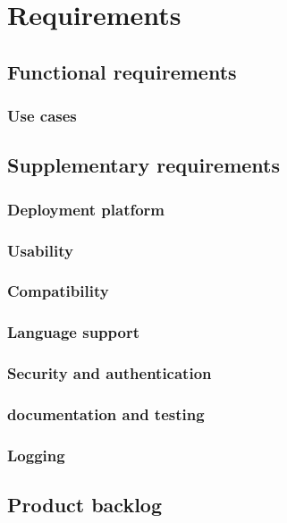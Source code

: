 \chapter{Requirements}

\section{Functional requirements}
\subsection{Use cases}
\section{Supplementary requirements}
\subsection{Deployment platform}
\subsection{Usability}
\subsection{Compatibility}
\subsection{Language support}
\subsection{Security and authentication}
\subsection{documentation and testing}
\subsection{Logging}
\section{Product backlog}
